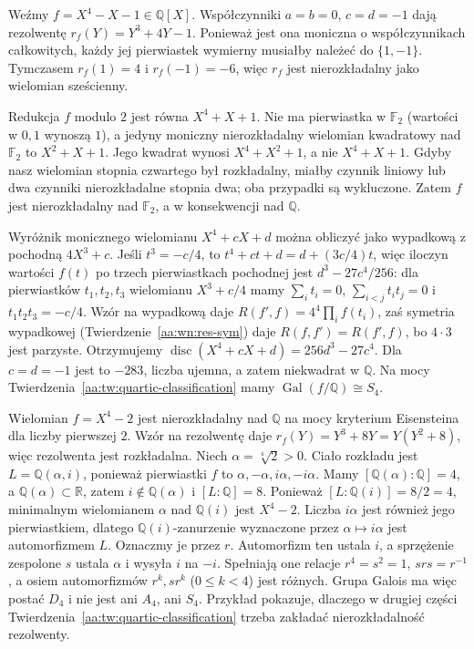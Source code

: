 \begin{przyklad}[Grupa $S_4$]\label{aa:prz:quartic-s4}
Weźmy $f=X^4-X-1\in\mathbb Q[X]$. Współczynniki
$a=b=0$, $c=d=-1$ dają rezolwentę
$r_f(Y)=Y^3+4Y-1$.
Ponieważ jest ona moniczna o współczynnikach całkowitych,
każdy jej pierwiastek wymierny musiałby należeć do $\{1,-1\}$.
Tymczasem $r_f(1)=4$ i $r_f(-1)=-6$,
więc $r_f$ jest nierozkładalny jako wielomian sześcienny.

Redukcja $f$ modulo $2$ jest równa $X^4+X+1$.
Nie ma pierwiastka w $\mathbb F_2$ (wartości w $0,1$ wynoszą $1$),
a jedyny moniczny nierozkładalny wielomian kwadratowy
nad $\mathbb F_2$ to $X^2+X+1$.
Jego kwadrat wynosi $X^4+X^2+1$, a nie $X^4+X+1$.
Gdyby nasz wielomian stopnia czwartego był rozkładalny,
miałby czynnik liniowy lub dwa czynniki nierozkładalne stopnia dwa;
oba przypadki są wykluczone. Zatem $f$ jest nierozkładalny nad
$\mathbb F_2$, a w konsekwencji nad $\mathbb Q$.

Wyróżnik monicznego wielomianu $X^4+cX+d$ można obliczyć
jako wypadkową z pochodną $4X^3+c$.
Jeśli $t^3=-c/4$, to
$t^4+ct+d=d+(3c/4)t$, więc iloczyn wartości
$f(t)$ po trzech pierwiastkach pochodnej jest
$d^3-27c^4/256$: dla pierwiastków $t_1,t_2,t_3$
wielomianu $X^3+c/4$ mamy $\sum_i t_i=0$,
$\sum_{i<j}t_it_j=0$ i $t_1t_2t_3=-c/4$.
Wzór na wypadkową daje
$R(f',f)=4^4\prod_i f(t_i)$, zaś symetria wypadkowej
(Twierdzenie~\ref{aa:wn:res-sym}) daje
$R(f,f')=R(f',f)$, bo $4\cdot3$ jest parzyste.
Otrzymujemy
$\operatorname{disc}(X^4+cX+d)=256d^3-27c^4$.
Dla $c=d=-1$ jest to $-283$, liczba ujemna, a zatem
niekwadrat w $\mathbb Q$. Na mocy
Twierdzenia~\ref{aa:tw:quartic-classification} mamy
$\operatorname{Gal}(f/\mathbb Q)\cong S_4$.
\end{przyklad}

\begin{przyklad}\label{aa:prz:quartic-v4}
Wielomian $f=X^4-2$ jest nierozkładalny nad $\mathbb Q$
na mocy kryterium Eisensteina dla liczby pierwszej $2$.
Wzór na rezolwentę daje
$r_f(Y)=Y^3+8Y=Y(Y^2+8)$, więc rezolwenta jest rozkładalna.
Niech $\alpha=\sqrt[4]{2}>0$. Ciało rozkładu jest
$L=\mathbb Q(\alpha,i)$, ponieważ pierwiastki $f$
to $\alpha,-\alpha,i\alpha,-i\alpha$.
Mamy $[\mathbb Q(\alpha):\mathbb Q]=4$, a
$\mathbb Q(\alpha)\subset\mathbb R$, zatem $i\notin\mathbb Q(\alpha)$
i $[L:\mathbb Q]=8$.
Ponieważ $[L:\mathbb Q(i)]=8/2=4$, minimalnym
wielomianem $\alpha$ nad $\mathbb Q(i)$ jest $X^4-2$.
Liczba $i\alpha$ jest również jego pierwiastkiem, dlatego
$\mathbb Q(i)$-zanurzenie wyznaczone przez
$\alpha\mapsto i\alpha$ jest automorfizmem $L$.
Oznaczmy je przez $r$. Automorfizm ten ustala $i$,
a sprzężenie zespolone $s$ ustala $\alpha$ i wysyła
$i$ na $-i$. Spełniają one relacje
$r^4=s^2=1$, $srs=r^{-1}$, a osiem automorfizmów
$r^k,sr^k$ ($0\le k<4$) jest różnych.
Grupa Galois ma więc postać $D_4$ i nie jest ani $A_4$, ani $S_4$.
Przykład pokazuje, dlaczego w drugiej części
Twierdzenia~\ref{aa:tw:quartic-classification} trzeba
zakładać nierozkładalność rezolwenty.
\end{przyklad}

